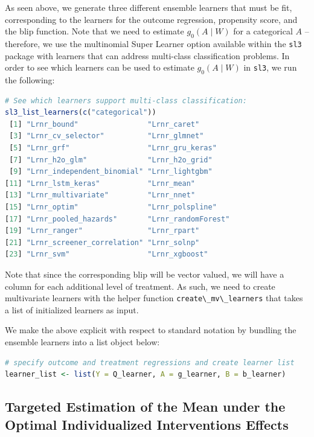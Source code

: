 \documentclass[
  12pt, krantz2,
]{krantz}
\newcommand{\passthrough}[1]{#1}
\theoremstyle{definition}
\theoremstyle{definition}
\theoremstyle{definition}
\newcommand{\1}{\mathbbm{1}}
\begin{document}
As seen above, we generate three different ensemble learners that must be fit,
corresponding to the learners for the outcome regression, propensity score, and
the blip function. Note that we need to estimate \(g_0(A \mid W)\) for a
categorical \(A\) -- therefore, we use the multinomial Super Learner option
available within the \passthrough{\lstinline!sl3!} package with learners that can address multi-class
classification problems. In order to see which learners can be used to estimate
\(g_0(A \mid W)\) in \passthrough{\lstinline!sl3!}, we run the following:

\begin{lstlisting}[language=R]
# See which learners support multi-class classification:
sl3_list_learners(c("categorical"))
 [1] "Lrnr_bound"                "Lrnr_caret"               
 [3] "Lrnr_cv_selector"          "Lrnr_glmnet"              
 [5] "Lrnr_grf"                  "Lrnr_gru_keras"           
 [7] "Lrnr_h2o_glm"              "Lrnr_h2o_grid"            
 [9] "Lrnr_independent_binomial" "Lrnr_lightgbm"            
[11] "Lrnr_lstm_keras"           "Lrnr_mean"                
[13] "Lrnr_multivariate"         "Lrnr_nnet"                
[15] "Lrnr_optim"                "Lrnr_polspline"           
[17] "Lrnr_pooled_hazards"       "Lrnr_randomForest"        
[19] "Lrnr_ranger"               "Lrnr_rpart"               
[21] "Lrnr_screener_correlation" "Lrnr_solnp"               
[23] "Lrnr_svm"                  "Lrnr_xgboost"             
\end{lstlisting}

Note that since the corresponding blip will be vector valued, we will have a
column for each additional level of treatment. As such, we need to create
multivariate learners with the helper function \passthrough{\lstinline!create\_mv\_learners!} that takes a
list of initialized learners as input.

We make the above explicit with respect to standard notation by bundling the
ensemble learners into a list object below:

\begin{lstlisting}[language=R]
# specify outcome and treatment regressions and create learner list
learner_list <- list(Y = Q_learner, A = g_learner, B = b_learner)
\end{lstlisting}

\hypertarget{oit-eval-cat-v1}{%
\subsection{Targeted Estimation of the Mean under the Optimal Individualized Interventions Effects}\label{oit-eval-cat-v1}}
\end{document}
